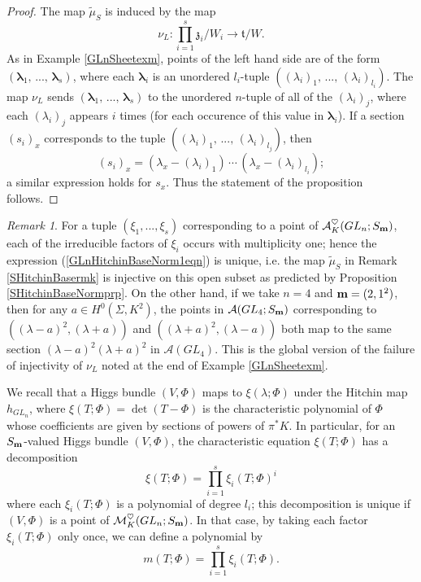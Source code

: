 \documentclass{amsart}
\theoremstyle{remark}
\newtheorem{remark}[theorem]{Remark}
\numberwithin{theorem}{section}
\numberwithin{equation}{section}
\begin{document}
\begin{proof}
The map $\tilde{\mu}_S$ is induced by the map
$$\nu_L:\prod_{i=1}^s\mathfrak{z}_i/W_i \rightarrow \mathfrak{t}/W.$$ As in Example \ref{GLnSheetexm}, points of the left hand side are of the form $(\boldsymbol{\lambda}_1,\, ...,\, \boldsymbol{\lambda}_s)$, where each $\boldsymbol{\lambda}_i$ is an unordered $l_i$-tuple $((\lambda_i)_1,\, ..., \, (\lambda_i)_{l_i})$. The map $\nu_L$ sends $(\boldsymbol{\lambda}_1,\,...,\,\boldsymbol{\lambda}_s)$ to the unordered $n$-tuple of all of the $(\lambda_i)_j$, where each $(\lambda_i)_j$ appears $i$ times (for each occurence of this value in $\boldsymbol{\lambda}_i$). If a section $(s_i)_x$ corresponds to the tuple $((\lambda_i)_1, \, ..., \, (\lambda_i)_{l_j})$, then
$$(s_i)_x = (\lambda_x - (\lambda_i)_1)\,\cdots\,(\lambda_x -(\lambda_i)_{l_i});$$
a similar expression holds for $s_x$. Thus the statement of the proposition follows.
\end{proof}

\begin{remark}\label{GLnHitchinBaseNormrmk}
    For a tuple $(\xi_1,...,\xi_s)$ corresponding to a point of $\mathcal A^\heartsuit_K(GL_n;S_{\bf m})$, each of the irreducible factors of $\xi_i$ occurs with multiplicity one; hence the expression (\ref{GLnHitchinBaseNorm1eqn}) is unique, i.e. the map $\tilde{\mu}_S$ in Remark \ref{SHitchinBasermk} is injective on this open subset as predicted by Proposition \ref{SHitchinBaseNormprp}. On the other hand, if we take $n=4$ and ${\bf m} = (2, 1^2)$, then for any $a \in H^0(\Sigma,K^2)$, the points in $\mathcal A(GL_4;S_{\bf m})$ corresponding to $((\lambda-a)^2,(\lambda+a))$ and $((\lambda+a)^2,(\lambda-a))$ both map to the same section $(\lambda-a)^2(\lambda+a)^2$ in $\mathcal A(GL_4)$. This is the global version of the failure of injectivity of $\nu_L$ noted at the end of Example \ref{GLnSheetexm}.
\end{remark}

We recall that a Higgs bundle $(V,\Phi)$ maps to $\xi(\lambda;\Phi)$ under the Hitchin map $h_{GL_n}$, where $\xi(T;\Phi) = \det(T -\Phi)$ is the characteristic polynomial of $\Phi$ whose coefficients are given by sections of powers of $\pi^*K$. In particular, for an $S_{\bf m}$-valued Higgs bundle $(V,\Phi)$, the characteristic equation $\xi(T;\Phi)$ has a decomposition
\begin{equation}\label{GLnHitchinNorm2eqn}
    \xi(T;\Phi) = \prod_{i=1}^s\xi_i(T;\Phi)^i
\end{equation}
where each $\xi_i(T;\Phi)$ is a polynomial of degree $l_i$; this decomposition is unique if $(V,\Phi)$ is a point of $\mathcal M_K^\heartsuit(GL_n;S_{\bf m})$. In that case, by taking each factor $\xi_i(T;\Phi)$ only once, we can define a polynomial by
\begin{equation}\label{MinPolyHiggsFibreeqn}
    m(T;\Phi) = \prod_{i=1}^s\xi_i(T;\Phi).
\end{equation}
\end{document}
